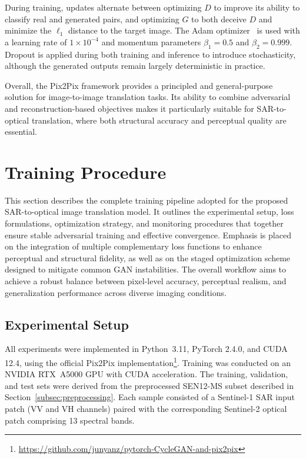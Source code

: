 During training, updates alternate between optimizing $D$ to improve its ability to classify real and generated pairs, and optimizing $G$ to both deceive $D$ and minimize the $\ell_1$ distance to the target image. The Adam optimizer~\cite{adam_optimizer_2017} is used with a learning rate of $1 \times 10^{-4}$ and momentum parameters $\beta_1 = 0.5$ and $\beta_2 = 0.999$. Dropout is applied during both training and inference to introduce stochasticity, although the generated outputs remain largely deterministic in practice.

Overall, the Pix2Pix framework provides a principled and general-purpose solution for image-to-image translation tasks. Its ability to combine adversarial and reconstruction-based objectives makes it particularly suitable for SAR-to-optical translation, where both structural accuracy and perceptual quality are essential.


\section{Training Procedure}
This section describes the complete training pipeline adopted for the proposed SAR-to-optical image translation model. It outlines the experimental setup, loss formulations, optimization strategy, and monitoring procedures that together ensure stable adversarial training and effective convergence. Emphasis is placed on the integration of multiple complementary loss functions to enhance perceptual and structural fidelity, as well as on the staged optimization scheme designed to mitigate common GAN instabilities. The overall workflow aims to achieve a robust balance between pixel-level accuracy, perceptual realism, and generalization performance across diverse imaging conditions.

\subsection{Experimental Setup} All experiments were implemented in Python~3.11, PyTorch 2.4.0, and CUDA 12.4, using the official Pix2Pix implementation\footnote{\url{https://github.com/junyanz/pytorch-CycleGAN-and-pix2pix}}. Training was conducted on an NVIDIA RTX~A5000 GPU with CUDA acceleration. The training, validation, and test sets were derived from the preprocessed SEN12-MS subset described in Section~\ref{subsec:preprocessing}. Each sample consisted of a Sentinel-1 SAR input patch (VV and VH channels) paired with the corresponding Sentinel-2 optical patch comprising 13 spectral bands.

